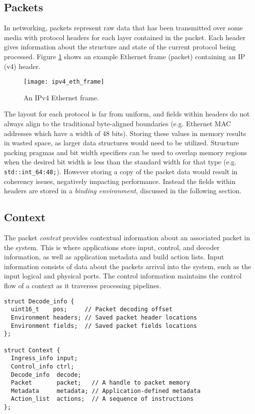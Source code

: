 \subsection{Packets}
In networking, packets represent raw data that has been transmitted over some
media with protocol headers for each layer contained in the packet. Each header
gives information about the structure and state of the current protocol being
processed. Figure \ref{ipv4_eth_frame} shows an example Ethernet frame
(packet) containing an IP (v4) header.

\begin{figure}[h]
\centering
\texttt{[image: ipv4\_eth\_frame]}
\caption{An IPv4 Ethernet frame.}
\label{ipv4_eth_frame}
\end{figure}

The layout for each protocol is far from uniform, and fields within headers do
not always align to the traditional byte-aligned boundaries (e.g. Ethernet
MAC addresses which have a width of 48 bits). Storing these values in memory
results in wasted space, as larger data structures would need to be utilized.
Structure packing pragmas and bit width specifiers can be used to overlap
memory regions when the desired bit width is less than the standard width for
that type (e.g. \texttt{std::int\_64:48;}). However storing a copy of the
packet data would result in coherency issues, negatively impacting
performance. Instead the fields within headers are stored in a \emph{binding
environment}, discussed in the following section.

\subsection{Context}
The packet \emph{context} provides contextual information about an associated
packet in the system. This is where applications store input, control, and
decoder information, as well as application metadata and build action lists.
Input information consists of data about the packets arrival into the system,
such as the input logical and physical ports. The control information maintains
the control flow of a context as it traverses processing pipelines.

\begin{lstlisting}
struct Decode_info {
  uint16_t    pos;     // Packet decoding offset
  Environment headers; // Saved packet header locations
  Environment fields;  // Saved packet fields locations
};

struct Context {
  Ingress_info input;
  Control_info ctrl;
  Decode_info  decode;
  Packet       packet;   // A handle to packet memory
  Metadata     metadata; // Application-defined metadata
  Action_list  actions;  // A sequence of instructions
};
\end{lstlisting}

